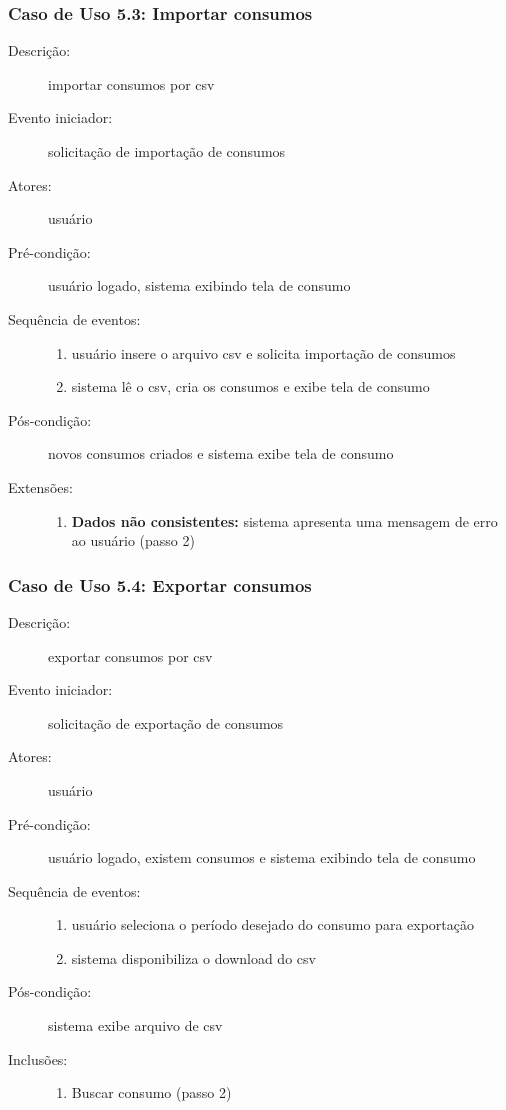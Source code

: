 \subsubsection{Caso de Uso 5.3: Importar consumos}
\begin{description}
	\item[Descrição:] importar consumos por csv
	\item[Evento iniciador:] solicitação de importação de consumos
	\item[Atores:] usuário
	\item[Pré-condição:] usuário logado, sistema exibindo tela de consumo
	\item[Sequência de eventos:] \hfill
		\begin{enumerate}
			\item{usuário insere o arquivo csv e solicita importação de consumos}
			\item{sistema lê o csv, cria os consumos e exibe tela de consumo}
		\end{enumerate}
	\item[Pós-condição:] novos consumos criados e sistema exibe tela de consumo
	\item[Extensões:] \hfill
		\begin{enumerate}
			\item{\textbf{Dados não consistentes:} sistema apresenta uma mensagem de erro ao usuário (passo 2)}
		\end{enumerate}
\end{description}
%
\subsubsection{Caso de Uso 5.4: Exportar consumos}
\begin{description}
	\item[Descrição:] exportar consumos por csv
	\item[Evento iniciador:] solicitação de exportação de consumos
	\item[Atores:] usuário
	\item[Pré-condição:] usuário logado, existem consumos e sistema exibindo tela de consumo
	\item[Sequência de eventos:] \hfill
		\begin{enumerate}
			\item{usuário seleciona o período desejado do consumo para exportação}
			\item{sistema disponibiliza o download do csv}
		\end{enumerate}
	\item[Pós-condição:] sistema exibe arquivo de csv
	\item[Inclusões:] \hfill
		\begin{enumerate}
			\item{Buscar consumo (passo 2)}
		\end{enumerate}
\end{description}
